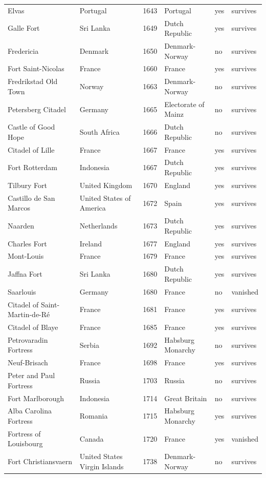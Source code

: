 \documentclass[11pt,a4paper]{article}
\begin{document}
{\begin{longtable}{p{4.6cm}p{3.2cm}rp{3.2cm}ll}
Elvas & Portugal & 1643 & Portugal & yes & survives\\
Galle Fort & Sri Lanka & 1649 & Dutch Republic & yes & survives\\
Fredericia & Denmark & 1650 & Denmark-Norway & no & survives\\
Fort Saint-Nicolas & France & 1660 & France & yes & survives\\
Fredrikstad Old Town & Norway & 1663 & Denmark-Norway & no & survives\\
Petersberg Citadel & Germany & 1665 & Electorate of Mainz & no & survives\\
Castle of Good Hope & South Africa & 1666 & Dutch Republic & no & survives\\
Citadel of Lille & France & 1667 & France & yes & survives\\
Fort Rotterdam & Indonesia & 1667 & Dutch Republic & yes & survives\\
Tilbury Fort & United Kingdom & 1670 & England & yes & survives\\
Castillo de San Marcos & United States of America & 1672 & Spain & yes & survives\\
Naarden & Netherlands & 1673 & Dutch Republic & yes & survives\\
Charles Fort & Ireland & 1677 & England & yes & survives\\
Mont-Louis & France & 1679 & France & yes & survives\\
Jaffna Fort & Sri Lanka & 1680 & Dutch Republic & yes & survives\\
Saarlouis & Germany & 1680 & France & no & vanished\\
Citadel of Saint-Martin-de-Ré & France & 1681 & France & yes & survives\\
Citadel of Blaye & France & 1685 & France & yes & survives\\
Petrovaradin Fortress & Serbia & 1692 & Habsburg Monarchy & no & survives\\
Neuf-Brisach & France & 1698 & France & yes & survives\\
Peter and Paul Fortress & Russia & 1703 & Russia & no & survives\\
Fort Marlborough & Indonesia & 1714 & Great Britain & no & survives\\
Alba Carolina Fortress & Romania & 1715 & Habsburg Monarchy & yes & survives\\
Fortress of Louisbourg & Canada & 1720 & France & yes & vanished\\
Fort Christiansvaern & United States Virgin Islands & 1738 & Denmark-Norway & no & survives\\

\end{longtable}}
\end{document}
